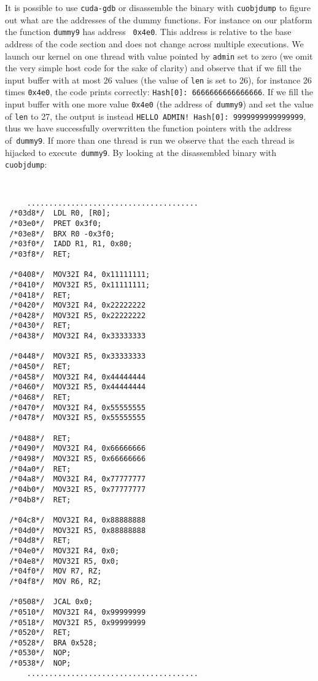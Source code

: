 \documentclass[11pt]{llncs}
\begin{document}
It is possible to use \texttt{cuda-gdb} or disassemble the binary with \texttt{cuobjdump} to figure out what are the addresses of the dummy functions. For instance on our platform the function \texttt{dummy9} has address~ \texttt{0x4e0}.
This address is relative to the base address of the code section and does not change across multiple executions.
We launch our kernel on one thread with value pointed by \texttt{admin} set to zero (we omit the very simple host code for the sake of clarity) and observe that if we fill the input buffer with at most 26 values (the value of \texttt{len} is set to 26), for instance 26 times \texttt{0x4e0}, the code prints correctly: \texttt{Hash[0]: 6666666666666666}.
If we fill the input buffer with one more value \texttt{0x4e0} (the address of~\texttt{dummy9}) and set the value of \texttt{len} to 27, the output is instead \texttt{HELLO ADMIN! Hash[0]: 9999999999999999}, thus we have successfully overwritten the function pointers with the address of~\texttt{dummy9}.
If more than one thread is run we observe that the each thread is hijacked to execute~\texttt{dummy9}.
By looking at the disassembled binary with \texttt{cuobjdump}: {\tt \small
\begin{verbatim}
     .......................................
 /*03d8*/  LDL R0, [R0];          
 /*03e0*/  PRET 0x3f0;          
 /*03e8*/  BRX R0 -0x3f0;        
 /*03f0*/  IADD R1, R1, 0x80;     
 /*03f8*/  RET;                 
                             
 /*0408*/  MOV32I R4, 0x11111111; 
 /*0410*/  MOV32I R5, 0x11111111; 
 /*0418*/  RET;                
 /*0420*/  MOV32I R4, 0x22222222
 /*0428*/  MOV32I R5, 0x22222222
 /*0430*/  RET;                
 /*0438*/  MOV32I R4, 0x33333333
                             
 /*0448*/  MOV32I R5, 0x33333333
 /*0450*/  RET;                
 /*0458*/  MOV32I R4, 0x44444444
 /*0460*/  MOV32I R5, 0x44444444
 /*0468*/  RET;                
 /*0470*/  MOV32I R4, 0x55555555
 /*0478*/  MOV32I R5, 0x55555555
                             
 /*0488*/  RET;                
 /*0490*/  MOV32I R4, 0x66666666
 /*0498*/  MOV32I R5, 0x66666666
 /*04a0*/  RET;                
 /*04a8*/  MOV32I R4, 0x77777777
 /*04b0*/  MOV32I R5, 0x77777777
 /*04b8*/  RET;                
                             
 /*04c8*/  MOV32I R4, 0x88888888
 /*04d0*/  MOV32I R5, 0x88888888
 /*04d8*/  RET;                
 /*04e0*/  MOV32I R4, 0x0;       
 /*04e8*/  MOV32I R5, 0x0;       
 /*04f0*/  MOV R7, RZ;          
 /*04f8*/  MOV R6, RZ;          
                             
 /*0508*/  JCAL 0x0;            
 /*0510*/  MOV32I R4, 0x99999999
 /*0518*/  MOV32I R5, 0x99999999
 /*0520*/  RET;                
 /*0528*/  BRA 0x528;           
 /*0530*/  NOP;                
 /*0538*/  NOP;                
     .......................................
\end{verbatim}
}
\end{document}
